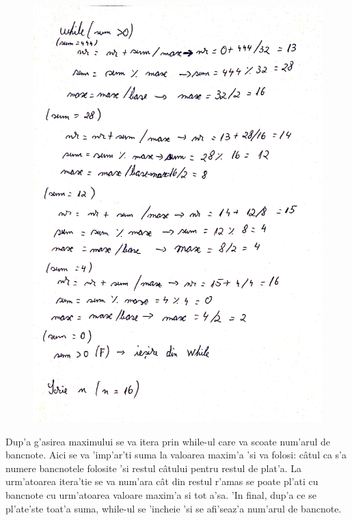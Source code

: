 \begin{figure}[H]
\centering
\includegraphics[scale = 0.2]{Greedy/while}
\end{figure}
\myindent
Dup'a g'asirea maximului se va itera prin while-ul care va scoate num'arul de bancnote. Aici se va 'imp'ar'ti suma la valoarea maxim'a 'si va folosi: c\^atul ca s'a numere bancnotele folosite 'si restul c\^atului pentru restul de plat'a. La urm'atoarea itera'tie se va num'ara c\^at din restul r'amas se poate pl'ati cu bancnote cu urm'atoarea valoare maxim'a si tot a'sa. 'In final, dup'a ce se pl'ate'ste toat'a suma, while-ul se 'incheie 'si se afi'seaz'a num'arul de bancnote.